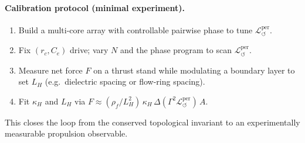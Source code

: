 \documentclass[11pt]{article}
\begin{document}
\paragraph{Calibration protocol (minimal experiment).}
    \begin{enumerate}
    \item Build a multi-core array with controllable pairwise phase to tune $\mathcal{L}_{\circlearrowleft}^{\mathrm{per}}$.
    \item Fix $(r_c,C_e)$ drive; vary $N$ and the phase program to scan $\mathcal{L}_{\circlearrowleft}^{\mathrm{per}}$.
    \item Measure net force $F$ on a thrust stand while modulating a boundary layer to set $L_H$ (e.g.\ dielectric spacing or flow-ring spacing).
    \item Fit $\kappa_H$ and $L_H$ via $F \approx (\rho_{\!f}/L_H^2)\,\kappa_H\,\Delta(\Gamma^2\mathcal{L}_{\circlearrowleft}^{\mathrm{per}})\,A$.
    \end{enumerate}
    This closes the loop from the conserved topological invariant to an experimentally measurable propulsion observable.



\end{document}
